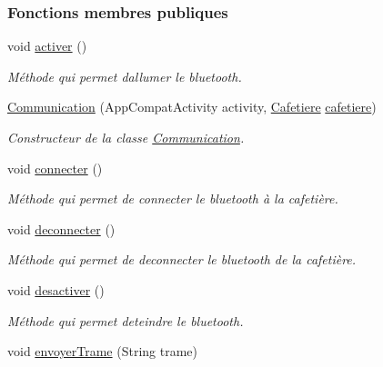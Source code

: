 \subsubsection*{Fonctions membres publiques}
\begin{DoxyCompactItemize}
\item 
void \hyperlink{classcom_1_1example_1_1ekawa_1_1_communication_a64e0731414722f27a990d8ac884aca83}{activer} ()
\begin{DoxyCompactList}\small\item\em Méthode qui permet d\textquotesingle{}allumer le bluetooth. \end{DoxyCompactList}\item 
\hyperlink{classcom_1_1example_1_1ekawa_1_1_communication_a78557db29f39808417c9fa4435b90d3b}{Communication} (App\+Compat\+Activity activity, \hyperlink{classcom_1_1example_1_1ekawa_1_1_cafetiere}{Cafetiere} \hyperlink{classcom_1_1example_1_1ekawa_1_1_communication_a3b69b78cdf60bc35b2e3e564519dc1b6}{cafetiere})
\begin{DoxyCompactList}\small\item\em Constructeur de la classe \hyperlink{classcom_1_1example_1_1ekawa_1_1_communication}{Communication}. \end{DoxyCompactList}\item 
void \hyperlink{classcom_1_1example_1_1ekawa_1_1_communication_af0cb2a6a5c1674a7204174ba786e8596}{connecter} ()
\begin{DoxyCompactList}\small\item\em Méthode qui permet de connecter le bluetooth à la cafetière. \end{DoxyCompactList}\item 
void \hyperlink{classcom_1_1example_1_1ekawa_1_1_communication_a024ca42abcc8727d303a54ec44b4c99b}{deconnecter} ()
\begin{DoxyCompactList}\small\item\em Méthode qui permet de deconnecter le bluetooth de la cafetière. \end{DoxyCompactList}\item 
void \hyperlink{classcom_1_1example_1_1ekawa_1_1_communication_a230dde1900a47e26832b7467eddc556a}{desactiver} ()
\begin{DoxyCompactList}\small\item\em Méthode qui permet d\textquotesingle{}eteindre le bluetooth. \end{DoxyCompactList}\item 
void \hyperlink{classcom_1_1example_1_1ekawa_1_1_communication_a98808d0236e547b9a3ee485f66aa7af0}{envoyer\+Trame} (String trame)

\end{DoxyCompactItemize}
